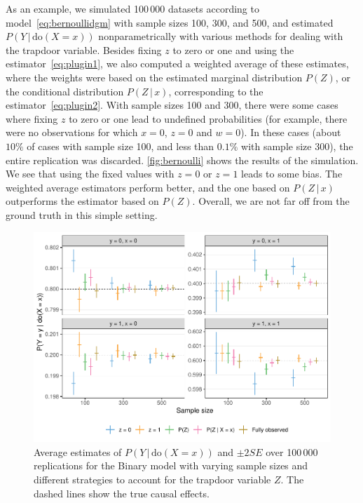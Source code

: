 \documentclass[11pt,a4paper,twoside]{article}
\newcommand{\+}[1]{\ensuremath{\mathbf{#1}}}
\newcommand{\doo}{\textrm{do}}
\newcommand{\given}{{ \, | \, }}
\newcommand{\z}{trapdoor variable}
\begin{document}
	As an example, we simulated 100\,000 datasets according to model~\eqref{eq:bernoullidgm} with sample sizes 100, 300, and 500, and estimated $P(Y\given \doo(X = x))$ nonparametrically with various methods for dealing with the \z. Besides fixing $z$ to zero or one and using the estimator~\eqref{eq:plugin1}, we also computed a weighted average of these estimates, where the weights were based on the estimated marginal distribution $P(Z)$, or the conditional distribution $P(Z \given x)$, corresponding to the estimator~\eqref{eq:plugin2}. With sample sizes 100 and 300, there were some cases where fixing $z$ to zero or one lead to undefined probabilities (for example, there were no observations for which $x = 0$, $z = 0$ and $w = 0$). In these cases (about $10\%$ of cases with sample size 100, and less than $0.1\%$ with sample size 300), the entire replication was discarded. \autoref{fig:bernoulli} shows the results of the simulation. We see that using the fixed values with $z=0$ or $z=1$ leads to some bias. The weighted average estimators perform better, and the one based on $P(Z \given x)$ outperforms the estimator based on $P(Z)$. Overall, we are not far off from the ground truth in this simple setting.
	\begin{figure}[!ht]
		\centering
		\includegraphics[width=\textwidth]{figures/bernoulli.pdf} 
		\caption{Average estimates of $P(Y \given \doo(X = x))$ and $\pm 2 SE$ over 100\,000 replications for the Binary model with varying sample sizes and different strategies to account for the \z{} $Z$. The dashed lines show the true causal effects.}
		\label{fig:bernoulli}
	\end{figure}
	
\end{document}
